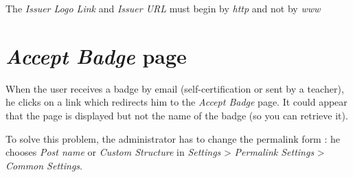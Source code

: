 \documentclass[a4paper, 12pt]{report}
\begin{document}
		The \textit{Issuer Logo Link} and \textit{Issuer URL} must begin by \textit{http} and not by \textit{www}
		
		\section{\textit{Accept Badge} page}
		
		When the user receives a badge by email (self-certification or sent by a teacher), he clicks on a link which redirects him to the \textit{Accept Badge} page. It could appear that the page is displayed but not the name of the badge (so you can retrieve it).
		
		To solve this problem, the administrator has to change the permalink form : he chooses \textit{Post name} or \textit{Custom Structure} in \textit{Settings} > \textit{Permalink Settings} > \textit{Common Settings}.
\end{document}
